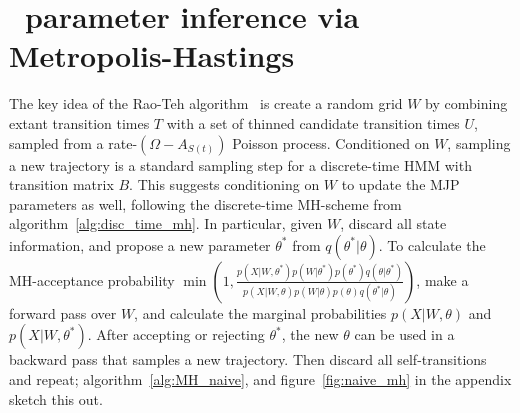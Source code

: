 \section{\Naive\ parameter inference via Metropolis-Hastings}

The key idea of the Rao-Teh algorithm~\cite{RaoTeh13} is create a random 
grid $W$ by combining extant transition times $T$ with a set of 
thinned candidate transition times $U$, sampled from a rate-$(\Omega-A_{S(t)})$ 
Poisson process. Conditioned on $W$, sampling a new trajectory is a 
standard sampling step for a discrete-time HMM with transition matrix $B$. 
This suggests conditioning on $W$ to update
the MJP parameters as well, following the discrete-time MH-scheme from
algorithm~\ref{alg:disc_time_mh}.
In particular, given $W$, discard all state information, and propose a 
new parameter $\theta^*$ from $q(\theta^*|\theta)$. 
To calculate the MH-acceptance probability $\min\left(1,
\frac{p(X|W,\theta^*)p(W|\theta^*)p(\theta^*)q(\theta|\theta^*)}
     {p(X|W,\theta)p(W|\theta)p(\theta)q(\theta^*|\theta)}\right)$, 
make a forward pass over $W$, and calculate the marginal 
probabilities $p(X|W,\theta)$ and $p(X|W,\theta^*)$. %
After accepting or rejecting $\theta^*$, the new $\theta$ can be used in
a backward pass that samples a new trajectory. Then discard all 
self-transitions and repeat; algorithm~\ref{alg:MH_naive}, and 
figure~\ref{fig:naive_mh} in the appendix sketch this out.
\vspace{-.1in}
